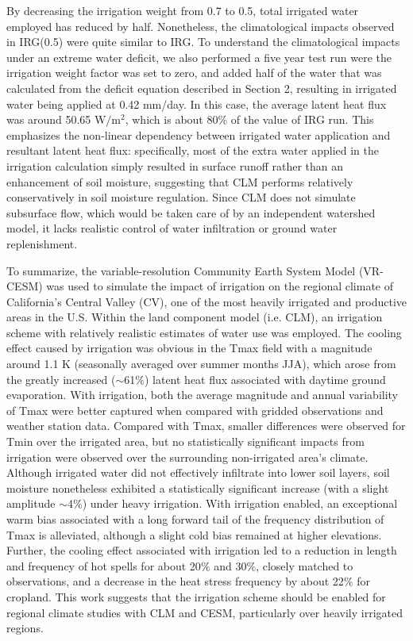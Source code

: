 \documentclass[draft,ms]{agutex}   %
\begin{document}
\begin{article}
By decreasing the irrigation weight from 0.7 to 0.5, total irrigated water employed has reduced by half. Nonetheless, the climatological impacts observed in IRG(0.5) were quite similar to IRG. To understand the climatological impacts under an extreme water deficit, we also performed a five year test run were the irrigation weight factor was set to zero, and added half of the water that was calculated from the deficit equation described in Section 2, resulting in irrigated water being applied at 0.42 mm/day. In this case, the average latent heat flux was around 50.65 W$/$m$^2$, which is about 80$\%$ of the value of IRG run.  This emphasizes the non-linear dependency between irrigated water application and resultant latent heat flux: specifically, most of the extra water applied in the irrigation calculation simply resulted in surface runoff rather than an enhancement of soil moisture, suggesting that CLM performs relatively conservatively in soil moisture regulation. Since CLM does not simulate subsurface flow, which would be taken care of by an independent watershed model, it lacks realistic control of water infiltration or ground water replenishment.

To summarize, the variable-resolution Community Earth System Model (VR-CESM) was used to simulate the impact of irrigation on the regional climate of California's Central Valley (CV), one of the most heavily irrigated and productive areas in the U.S. Within the land component model (i.e. CLM), an irrigation scheme with relatively realistic estimates of water use was employed. The cooling effect caused by irrigation was obvious in the Tmax field with a magnitude around 1.1 K (seasonally averaged over summer months JJA), which arose from the greatly increased ($\sim$61$\%$) latent heat flux associated with daytime ground evaporation. With irrigation, both the average magnitude and annual variability of Tmax were better captured when compared with gridded observations and weather station data. Compared with Tmax, smaller differences were observed for Tmin over the irrigated area, but no statistically significant impacts from irrigation were observed over the surrounding non-irrigated area's climate. Although irrigated water did not effectively infiltrate into lower soil layers, soil moisture nonetheless exhibited a statistically significant increase (with a slight amplitude $\sim$4$\%$) under heavy irrigation. With irrigation enabled, an exceptional warm bias associated with a long forward tail of the frequency distribution of Tmax is alleviated, although a slight cold bias remained at higher elevations. Further, the cooling effect associated with irrigation led to a reduction in length and frequency of hot spells for about 20$\%$ and 30$\%$, closely matched to observations, and a decrease in the heat stress frequency by about 22$\%$ for cropland. This work suggests that the irrigation scheme should be enabled for regional climate studies with CLM and CESM, particularly over heavily irrigated regions.


\end{article}
\end{document}
